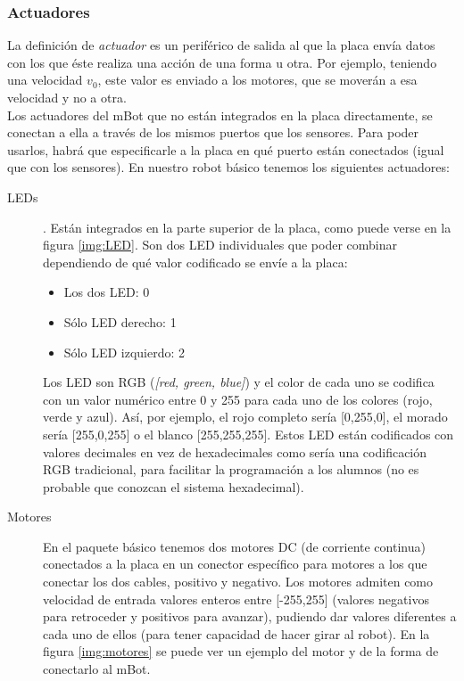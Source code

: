 \subsubsection{Actuadores}\label{subsec:actuadores}
	La definición de \textit{actuador} es un periférico de salida al que la placa envía datos con los que éste realiza una acción de una forma u otra. Por ejemplo, teniendo una velocidad $v_0$, este valor es enviado a los motores, que se moverán a esa velocidad y no a otra. \\
	Los actuadores del mBot que no están integrados en la placa directamente, se conectan a ella a través de los mismos puertos que los sensores. Para poder usarlos, habrá que especificarle a la placa en qué puerto están conectados (igual que con los sensores). En nuestro robot básico tenemos los siguientes actuadores:
	\begin{description}
	\item [LEDs]. Están integrados en la parte superior de la placa, como puede verse en la figura \ref{img:LED}. Son dos LED individuales que poder combinar dependiendo de qué valor codificado se envíe a la placa:
	\begin{itemize}
		\item Los dos LED: 0
		\item Sólo LED derecho: 1
		\item Sólo LED izquierdo: 2
	\end{itemize}
	Los LED son RGB (\textit{[red, green, blue]}) y el color de cada uno se codifica con un valor numérico entre 0 y 255 para cada uno de los colores (rojo, verde y azul). Así, por ejemplo, el rojo completo sería [0,255,0], el morado sería [255,0,255] o el blanco [255,255,255]. Estos LED están codificados con valores decimales en vez de hexadecimales como sería una codificación RGB tradicional, para facilitar la programación a los alumnos (no es probable que conozcan el sistema hexadecimal).		
	
	\item [Motores] En el paquete básico tenemos dos motores DC (de corriente continua) conectados a la placa en un conector específico para motores a los que conectar los dos cables, positivo y negativo. Los motores admiten como velocidad de entrada valores enteros entre [-255,255] (valores negativos para retroceder y positivos para avanzar), pudiendo dar valores diferentes a cada uno de ellos (para tener capacidad de hacer girar al robot). En la figura \ref{img:motores} se puede ver un ejemplo del motor y de la forma de conectarlo al mBot.	


\end{description}

